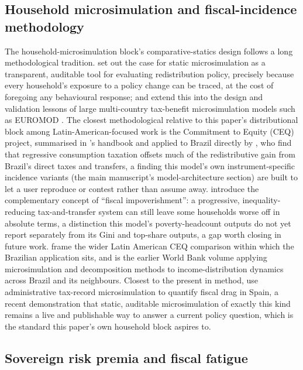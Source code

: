 \documentclass[11pt,a4paper]{article}
\begin{document}
\subsection{Household microsimulation and fiscal-incidence methodology}
\label{sec:lit-microsim}

The household-microsimulation block's comparative-statics design follows a long methodological tradition. \citet{bourguignonspadaro2006} set out the case for static microsimulation as a transparent, auditable tool for evaluating redistribution policy, precisely because every household's exposure to a policy change can be traced, at the cost of foregoing any behavioural response; \citet{immervollodonoghue2009} and \citet{figaripaulussutherland2015} extend this into the design and validation lessons of large multi-country tax-benefit microsimulation models such as EUROMOD \citep{sutherlandfigari2013}. The closest methodological relative to this paper's distributional block among Latin-American-focused work is the Commitment to Equity (CEQ) project, summarised in \citet{lustig2018ceq}'s handbook and applied to Brazil directly by \citet{higginspereira2014}, who find that regressive consumption taxation offsets much of the redistributive gain from Brazil's direct taxes and transfers, a finding this model's own instrument-specific incidence variants (the main manuscript's model-architecture section) are built to let a user reproduce or contest rather than assume away. \citet{higginslustig2016} introduce the complementary concept of ``fiscal impoverishment'': a progressive, inequality-reducing tax-and-transfer system can still leave some households worse off in absolute terms, a distinction this model's poverty-headcount outputs do not yet report separately from its Gini and top-share outputs, a gap worth closing in future work. \citet{lustigpessinoscott2014} frame the wider Latin American CEQ comparison within which the Brazilian application sits, and \citet{bourguignonferreiralustig2004} is the earlier World Bank volume applying microsimulation and decomposition methods to income-distribution dynamics across Brazil and its neighbours. Closest to the present in method, \citet{balladaresgarciamiralles2026} use administrative tax-record microsimulation to quantify fiscal drag in Spain, a recent demonstration that static, auditable microsimulation of exactly this kind remains a live and publishable way to answer a current policy question, which is the standard this paper's own household block aspires to.

\subsection{Sovereign risk premia and fiscal fatigue}
\label{sec:lit-premium}
\end{document}
